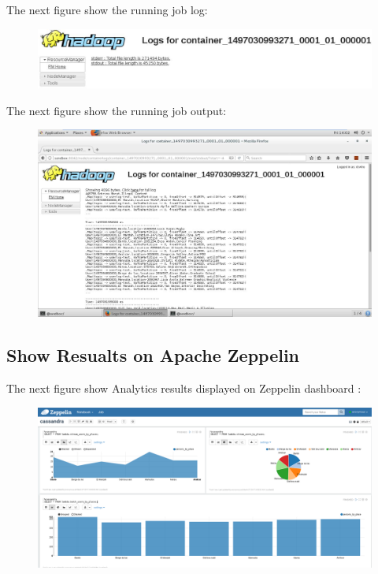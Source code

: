 \newpage
The next figure show the running job log:
\begin{figure}[h!]
	\centering
	\includegraphics[height=0.1\textheight]{fig01/JobLog}
	\label{fig:FilialesEtClients}
\end{figure}

The next figure show the running job output:
\begin{figure}[h!]
	\centering
	\includegraphics[height=0.4\textheight]{fig01/JobLogResualts}
	\label{fig:FilialesEtClients}
\end{figure}
\newpage
\subsection{Show Resualts on Apache Zeppelin}
\label{sec:sec01}
The next figure show Analytics results displayed on Zeppelin dashboard :
\begin{figure}[h!]
	\centering
	\includegraphics[height=0.3\textheight]{fig01/zeppelin}
	\label{fig:FilialesEtClients}
\end{figure}
